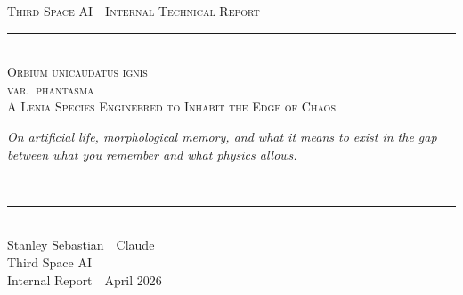 \documentclass[11pt,a4paper]{article}
\begin{document}
\thispagestyle{empty}
\vspace*{1.2cm}

\begin{center}
  {\sffamily\footnotesize\textcolor{muted}{\textsc{Third Space AI \,\textperiodcentered\, Internal Technical Report}}}\\[28pt]

  {\color{rule}\rule{0.3\linewidth}{0.3pt}}\\[26pt]

  {\fontsize{26}{30}\selectfont\scshape\color{headinc}
    Orbium unicaudatus ignis\\[2pt]
    var.\ phantasma}\\[14pt]
  {\Large\color{accent}\scshape{A Lenia Species Engineered to Inhabit the Edge of Chaos}}\\[22pt]

  \begin{minipage}{0.82\linewidth}
    \centering\itshape\large\color{headinc}
    On artificial life, morphological memory, and what it means to exist in
    the gap between what you remember and what physics allows.
  \end{minipage}\\[32pt]

  {\color{rule}\rule{0.3\linewidth}{0.3pt}}\\[32pt]

  {\large Stanley Sebastian \,\textperiodcentered\, Claude}\\[4pt]
  {\sffamily\small\textcolor{muted}{Third Space AI}}\\[18pt]
  {\sffamily\footnotesize\textcolor{muted}{Internal Report \,\textperiodcentered\, April 2026}}
\end{center}

\vfill
\end{document}

